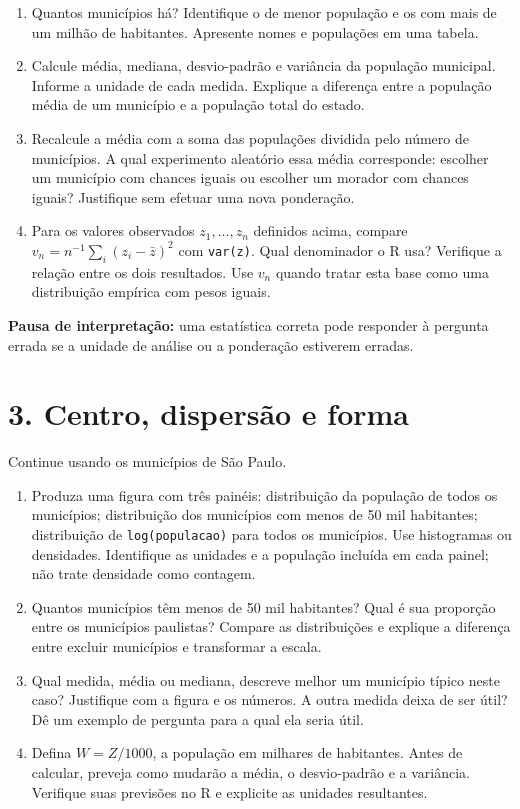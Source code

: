 \documentclass[
  brazilian,
  11pt,
  a4paper]{article}
\providecommand{\tightlist}{%
  \setlength{\itemsep}{0pt}\setlength{\parskip}{0pt}}
\begin{document}
\begin{enumerate}
\def\labelenumi{\alph{enumi}.}
\tightlist
\item
  Quantos municípios há? Identifique o de menor população e os com mais
  de um milhão de habitantes. Apresente nomes e populações em uma
  tabela.
\item
  Calcule média, mediana, desvio-padrão e variância da população
  municipal. Informe a unidade de cada medida. Explique a diferença
  entre a população média de um município e a população total do estado.
\item
  Recalcule a média com a soma das populações dividida pelo número de
  municípios. A qual experimento aleatório essa média corresponde:
  escolher um município com chances iguais ou escolher um morador com
  chances iguais? Justifique sem efetuar uma nova ponderação.
\item
  Para os valores observados \(z_1,\ldots,z_n\) definidos acima, compare
  \(v_n=n^{-1}\sum_i(z_i-\bar z)^2\) com \texttt{var(z)}. Qual
  denominador o R usa? Verifique a relação entre os dois resultados. Use
  \(v_n\) quando tratar esta base como uma distribuição empírica com
  pesos iguais.
\end{enumerate}

\textbf{Pausa de interpretação:} uma estatística correta pode responder
à pergunta errada se a unidade de análise ou a ponderação estiverem
erradas.

\newpage

\section{3. Centro, dispersão e
forma}\label{centro-dispersuxe3o-e-forma}

Continue usando os municípios de São Paulo.

\begin{enumerate}
\def\labelenumi{\alph{enumi}.}
\tightlist
\item
  Produza uma figura com três painéis: distribuição da população de
  todos os municípios; distribuição dos municípios com menos de 50 mil
  habitantes; distribuição de \texttt{log(populacao)} para todos os
  municípios. Use histogramas ou densidades. Identifique as unidades e a
  população incluída em cada painel; não trate densidade como contagem.
\item
  Quantos municípios têm menos de 50 mil habitantes? Qual é sua
  proporção entre os municípios paulistas? Compare as distribuições e
  explique a diferença entre excluir municípios e transformar a escala.
\item
  Qual medida, média ou mediana, descreve melhor um município típico
  neste caso? Justifique com a figura e os números. A outra medida deixa
  de ser útil? Dê um exemplo de pergunta para a qual ela seria útil.
\item
  Defina \(W=Z/1000\), a população em milhares de habitantes. Antes de
  calcular, preveja como mudarão a média, o desvio-padrão e a variância.
  Verifique suas previsões no R e explicite as unidades resultantes.
\end{enumerate}
\end{document}
